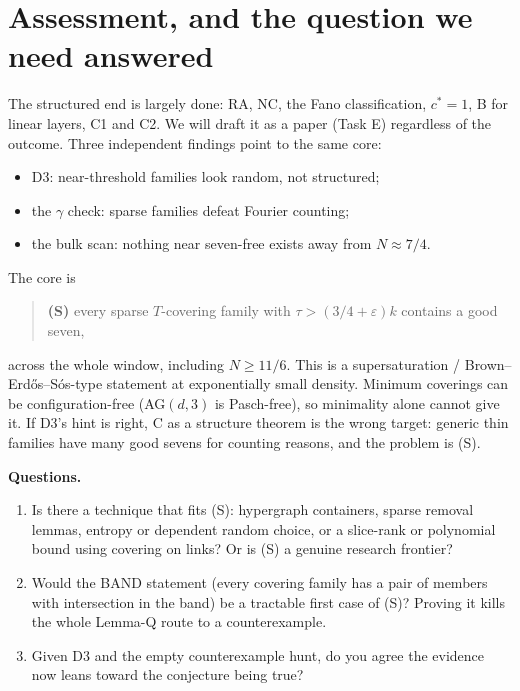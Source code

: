 \documentclass[11pt]{article}
\begin{document}
\section{Assessment, and the question we need answered}
The structured end is largely done: RA, NC, the Fano classification, $c^*=1$, B for linear layers, C1 and C2. We will draft
it as a paper (Task E) regardless of the outcome. Three independent findings point to the same core:
\begin{itemize}
\item D3: near-threshold families look random, not structured;
\item the $\gamma$ check: sparse families defeat Fourier counting;
\item the bulk scan: nothing near seven-free exists away from $N\approx7/4$.
\end{itemize}
The core is
\begin{quote}
\textbf{(S)} every sparse $T$-covering family with $\tau>(3/4+\varepsilon)k$ contains a good seven,
\end{quote}
across the whole window, including $N\ge11/6$. This is a supersaturation / Brown--Erd\H{o}s--S\'os-type statement at
exponentially small density. Minimum coverings can be configuration-free (AG$(d,3)$ is Pasch-free), so minimality alone
cannot give it. If D3's hint is right, C as a structure theorem is the wrong target: generic thin families have many good
sevens for counting reasons, and the problem is (S).

\textbf{Questions.}
\begin{enumerate}
\item Is there a technique that fits (S): hypergraph containers, sparse removal lemmas, entropy or dependent random choice,
or a slice-rank or polynomial bound using covering on links? Or is (S) a genuine research frontier?
\item Would the BAND statement (every covering family has a pair of members with intersection in the band) be a tractable
first case of (S)? Proving it kills the whole Lemma-Q route to a counterexample.
\item Given D3 and the empty counterexample hunt, do you agree the evidence now leans toward the conjecture being true?
\end{enumerate}
\end{document}
